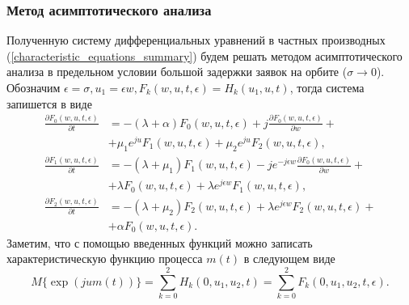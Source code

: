 \subsubsection{Метод асимптотического анализа}
Полученную систему дифференциальных уравнений в частных производных (\ref{characteristic_equations_summary}) будем решать методом асимптотического анализа в предельном условии большой задержки заявок на орбите ($\sigma \rightarrow 0$).
Обозначим $\epsilon = \sigma,   u_{1}= \epsilon w,   F_{k}(w,u,t,\epsilon) = H_{k}(u_{1},u,t)$, тогда система запишется в виде
\begin{equation} \label{asymptotic_equations_summary}
	\begin{split}
		\frac{{\partial F_{0}(w,u,t,\epsilon)}}{{\partial t}} &= -(\lambda + \alpha)F_{0}(w,u,t,\epsilon) + j
		\frac{{\partial F_{0}(w,u,t,\epsilon)}}{{\partial w}} +\\  &+ \mu_{1} e^{ju}F_{1}(w,u,t,\epsilon) + \mu_{2}e^{ju}F_{2}(w,u,t,\epsilon) ,
		\\
		\frac{{\partial F_{1}(w,u,t,\epsilon)}}{{\partial t}} &= -(\lambda + \mu_{1})F_{1}(w,u,t,\epsilon) - j e^{-j\epsilon w}
		\frac{{\partial F_{0}(w,u,t,\epsilon)}}{{\partial w}} +\\  &+ \lambda F_{0}(w,u,t,\epsilon) + \lambda e^{j\epsilon w}F_{1}(w,u,t,\epsilon) ,
		\\
		\frac{{\partial F_{2}(w,u,t,\epsilon)}}{{\partial t}} &= -(\lambda + \mu_{2})F_{2}(w,u,t,\epsilon)  + \lambda e^{j\epsilon w}F_{2}(w,u,t,\epsilon) +\\  &+ \alpha F_{0}(w,u,t,\epsilon).
	\end{split}
\end{equation}  
Заметим, что с помощью введенных функций можно записать характеристическую функцию процесса $m(t)$ в следующем виде
\begin{equation*}
	M\{\exp(jum(t))\}=\sum_{k=0}^{2}H_{k}(0,u_{1},u_{2},t) = \sum_{k=0}^{2}F_{k}(0,u_{1},u_{2},t,\epsilon).
\end{equation*}

